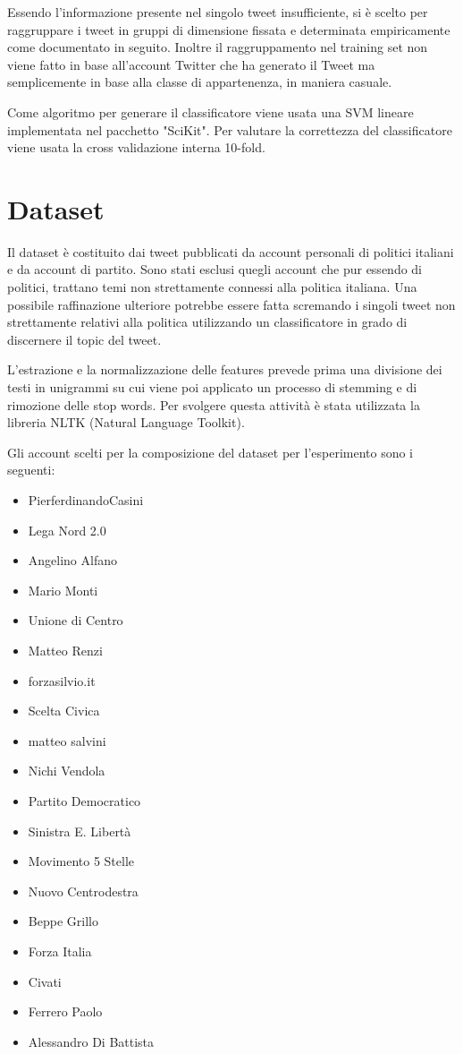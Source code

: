 \documentclass{article}
\begin{document}
Essendo l'informazione presente nel singolo tweet insufficiente, si è scelto per raggruppare i tweet in gruppi di dimensione fissata e determinata empiricamente come documentato in seguito. Inoltre il raggruppamento nel training set non viene fatto in base all'account Twitter che ha generato il Tweet ma semplicemente in base alla classe di appartenenza, in maniera casuale.

Come algoritmo per generare il classificatore viene usata una SVM lineare implementata nel pacchetto "SciKit". Per valutare la correttezza del classificatore viene usata la cross validazione interna 10-fold.

\section{Dataset}

Il dataset è costituito dai tweet pubblicati da account personali di politici italiani e da account di partito. Sono stati esclusi quegli account che pur essendo di politici, trattano temi non strettamente connessi alla politica italiana. Una possibile raffinazione ulteriore potrebbe essere fatta scremando i singoli tweet non strettamente relativi alla politica utilizzando un classificatore in grado di discernere il topic del tweet. 

L'estrazione e la normalizzazione delle features prevede prima una divisione dei testi in unigrammi su cui viene poi applicato un processo di stemming e di rimozione delle stop words. Per svolgere questa attività è stata utilizzata la libreria NLTK (Natural Language Toolkit).

Gli account scelti per la composizione del dataset per l'esperimento sono i seguenti:

\begin{itemize}
\item PierferdinandoCasini
\item Lega Nord 2.0
\item Angelino Alfano
\item Mario Monti
\item Unione di Centro
\item Matteo Renzi
\item forzasilvio.it
\item Scelta Civica
\item matteo salvini
\item Nichi Vendola
\item Partito Democratico
\item Sinistra E. Libertà
\item Movimento 5 Stelle 
\item Nuovo Centrodestra
\item Beppe Grillo
\item Forza Italia
\item Civati
\item Ferrero Paolo
\item Alessandro Di Battista

\end{itemize}
\end{document}
